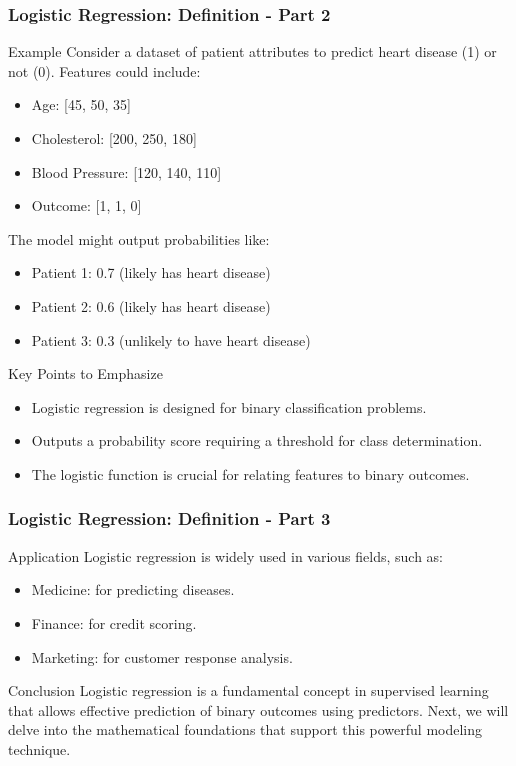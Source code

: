 \documentclass[aspectratio=169]{beamer}
\begin{document}
\begin{frame}[fragile]
    \frametitle{Logistic Regression: Definition - Part 2}
    \begin{block}{Example}
        Consider a dataset of patient attributes to predict heart disease (1) or not (0). Features could include:
        \begin{itemize}
            \item Age: [45, 50, 35]
            \item Cholesterol: [200, 250, 180]
            \item Blood Pressure: [120, 140, 110]
            \item Outcome: [1, 1, 0]
        \end{itemize}
        The model might output probabilities like:
        \begin{itemize}
            \item Patient 1: 0.7 (likely has heart disease)
            \item Patient 2: 0.6 (likely has heart disease)
            \item Patient 3: 0.3 (unlikely to have heart disease)
        \end{itemize}
    \end{block}

    \begin{block}{Key Points to Emphasize}
        \begin{itemize}
            \item Logistic regression is designed for binary classification problems.
            \item Outputs a probability score requiring a threshold for class determination.
            \item The logistic function is crucial for relating features to binary outcomes.
        \end{itemize}
    \end{block}
\end{frame}

\begin{frame}[fragile]
    \frametitle{Logistic Regression: Definition - Part 3}
    \begin{block}{Application}
        Logistic regression is widely used in various fields, such as:
        \begin{itemize}
            \item Medicine: for predicting diseases.
            \item Finance: for credit scoring.
            \item Marketing: for customer response analysis.
        \end{itemize}
    \end{block}

    \begin{block}{Conclusion}
        Logistic regression is a fundamental concept in supervised learning that allows effective prediction of binary outcomes using predictors. Next, we will delve into the mathematical foundations that support this powerful modeling technique.
    \end{block}
\end{frame}
\end{document}

